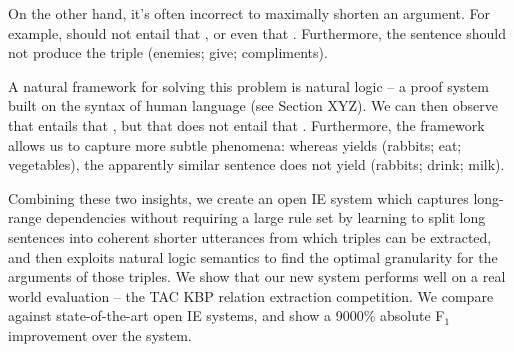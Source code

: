 On the other hand, it's often incorrect to maximally shorten an argument.
For example,  should not entail that
  , or even that .
Furthermore, the sentence  should not
  produce the triple (enemies; give; compliments).

A natural framework for solving this problem is natural logic -- 
  a proof system built on the syntax of human language (see Section XYZ).
We can then observe that
   entails
  that ,
  but that  does not entail that
  .
Furthermore, the framework allows us to capture more subtle phenomena:
  whereas  yields
  (rabbits; eat; vegetables), the apparently similar sentence
   does not yield
  (rabbits; drink; milk).

Combining these two insights, we create an open IE system which
  captures long-range dependencies without requiring a large rule set
  by learning to split long sentences into coherent shorter utterances
  from which triples can be extracted,
  and then exploits natural logic semantics to find the optimal granularity
  for the arguments of those triples.
We show that our new system performs well on a real world evaluation --
  the TAC KBP relation extraction competition.
We compare against state-of-the-art open IE systems, and show a
  9000\% absolute F$_1$ improvement over the system.
